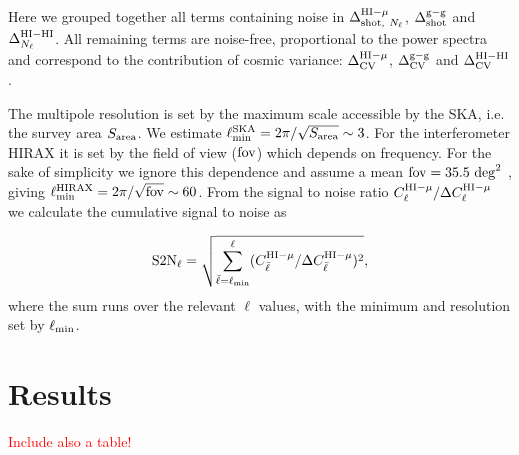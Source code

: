 \documentclass[useAMS,usenatbib]{mnras}
\newcommand{\be}{\begin{equation}}
\newcommand{\ee}{\end{equation}}
\newcommand{\ama}[1]{\textcolor{red}{{#1}}}
\begin{document}
Here we grouped together all terms containing noise in $\Delta^{{\rm HI-}\mu}_{{\rm shot,~}N_\ell}$, $\Delta_{\rm shot}^{\rm g-g}$ and $\Delta_{N_\ell}^{\rm HI-HI}$. All remaining terms are noise-free, proportional to the power spectra and correspond to the contribution of cosmic variance: $\Delta^{{\rm HI-}\mu}_{\rm CV}$, $\Delta_{\rm CV}^{\rm g-g}$ and $\Delta_{\rm CV}^{\rm HI-HI}$.


The multipole resolution is set by the maximum scale accessible by the SKA, i.e. the survey area $S_{\rm area}$. We estimate $\ell_{\rm min}^{\rm SKA} = 2\pi/\sqrt{S_{\rm area}} \sim 3$. For the interferometer HIRAX it is set by the field of view ($\rm fov$) which depends on frequency. For the sake of simplicity we ignore this dependence and assume a mean ${\rm fov} = 35.5 {\rm~deg}^2$ \citep{2016SPIE.9906E..5XN}, giving $\ell_{\rm min}^{\rm HIRAX} = 2\pi/\sqrt{\rm fov} \sim 60$. From the signal to noise ratio $C_\ell^{{\rm HI} - \mu} / \Delta C^{{\rm HI} - \mu}_\ell$ we calculate the cumulative signal to noise as

\be
{\rm S2N}_\ell = \sqrt{\sum_{\bar{\ell}=\ell_{\rm min}}^\ell (C_{\bar{\ell}}^{{\rm HI} - \mu} / \Delta C^{{\rm HI} - \mu}_{\bar{\ell}})^2},
\label{eq:s2ncum}
\ee
where the sum runs over the relevant $\ell$ values, with the minimum and resolution set by $\ell_{\rm min}$.

\section{Results}


\ama{Include also a table!}
\end{document}
